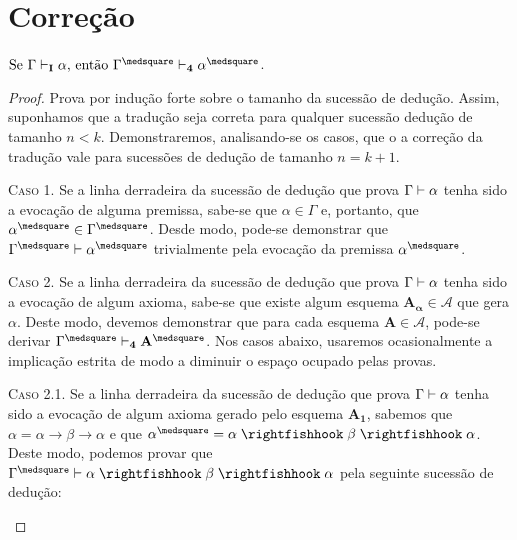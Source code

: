 \section{Correção}
    \begin{theorem}
        $\text{Se }\Gamma\entails_\mathbf{I}\alpha\text{, então }\Gamma^\medsquare\entails_\mathbf{4}\alpha^\medsquare$.
    \end{theorem}

    \begin{proof}
        Prova por indução forte sobre o tamanho da sucessão de dedução.
        Assim, suponhamos que a tradução seja correta para qualquer sucessão dedução de tamanho $n<k$.
        Demonstraremos, analisando-se os casos, que o a correção da tradução vale para sucessões de dedução de tamanho $n=k+1$.

        \begin{case}
            \textsc{Caso 1.}
            Se a linha derradeira da sucessão de dedução que prova $\Gamma\mathrel{\vdash}\alpha$ tenha sido a evocação de alguma premissa, sabe-se que $\alpha\in\Gamma$ e, portanto, que $\alpha^\medsquare\in\Gamma^\medsquare$. Desde modo, pode-se demonstrar que $\Gamma^\medsquare\entails\alpha^\medsquare$ trivialmente pela evocação da premissa $\alpha^\medsquare$.
        \end{case}

        \begin{case}
            \textsc{Caso 2.}
            Se a linha derradeira da sucessão de dedução que prova $\Gamma\mathrel{\vdash}\alpha$ tenha sido a evocação de algum axioma, sabe-se que existe algum esquema $\mathbf{A_\alpha}\in\mathcal{A}$ que gera $\alpha$. Deste modo, devemos demonstrar que para cada esquema $\mathbf{A}\in\mathcal{A}$, pode-se derivar $\Gamma^\medsquare\entails_\mathbf{4}\mathbf{A}^\medsquare$. Nos casos abaixo, usaremos ocasionalmente a implicação estrita de modo a diminuir o espaço ocupado pelas provas.
        \end{case}

            \begin{subcase}
                \textsc{Caso 2.1.} Se a linha derradeira da sucessão de dedução que prova $\Gamma\mathrel{\vdash}\alpha$ tenha sido a evocação de algum axioma gerado pelo esquema $\mathbf{A_1}$, sabemos que $\alpha=\alpha\to\beta\to\alpha$ e que $\alpha^\medsquare=\alpha\strictif\beta\strictif\alpha$. Deste modo, podemos provar que $\Gamma^\medsquare\entails\alpha\strictif\beta\strictif\alpha$ pela seguinte sucessão de dedução:


\end{subcase}
\end{proof}
